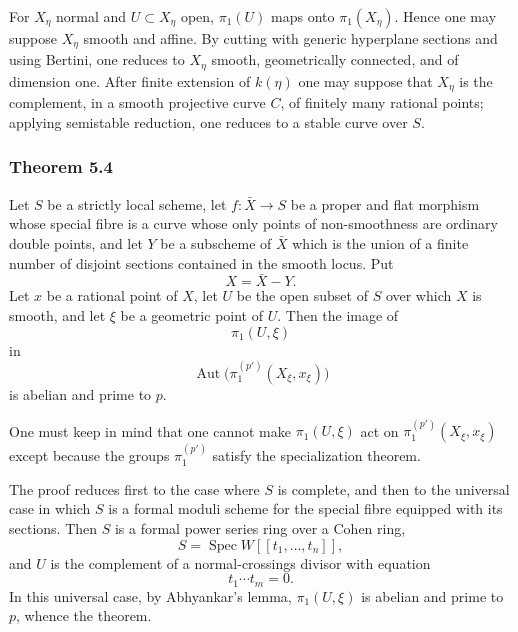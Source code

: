 \documentclass[11pt]{article}
\providecommand{\Spec}{\operatorname{Spec}}
\providecommand{\Aut}{\operatorname{Aut}}
\providecommand{\Hom}{\operatorname{Hom}}
\begin{document}
For $X_\eta$ normal and $U\subset X_\eta$ open, $\pi_1(U)$ maps onto $\pi_1(X_\eta)$. Hence one may suppose $X_\eta$ smooth and affine. By cutting with generic hyperplane sections and using Bertini, one reduces to $X_\eta$ smooth, geometrically connected, and of dimension one. After finite extension of $k(\eta)$ one may suppose that $X_\eta$ is the complement, in a smooth projective curve $C$, of finitely many rational points; applying semistable reduction, one reduces to a stable curve over $S$.



\providecommand{\cA}{\mathcal A}
\providecommand{\cV}{\mathcal V}
\providecommand{\cF}{\mathcal F}
\providecommand{\Hom}{\operatorname{Hom}}
\providecommand{\coker}{\operatorname{coker}}
\providecommand{\codim}{\operatorname{codim}}
\providecommand{\Coker}{\operatorname{Coker}}
\providecommand{\Picard}{\operatorname{Pic}}
\providecommand{\End}{\operatorname{End}}
\providecommand{\Prof}{\operatorname{prof}}
\providecommand{\Ima}{\operatorname{Im}}
\providecommand{\Frob}{\operatorname{Frob}}
\providecommand{\cQ}{\mathcal Q}
\providecommand{\Et}{\mathrm{et}}
\providecommand{\profp}{\widehat{\mathbb Z}^{(p')}}


\subsubsection*{Theorem 5.4}
Let $S$ be a strictly local scheme, let $f:\bar X\to S$ be a proper and flat morphism whose special fibre is a curve whose only points of non-smoothness are ordinary double points, and let $Y$ be a subscheme of $\bar X$ which is the union of a finite number of disjoint sections contained in the smooth locus. Put
\[
 X=\bar X-Y.
\]
Let $x$ be a rational point of $X$, let $U$ be the open subset of $S$ over which $X$ is smooth, and let $\xi$ be a geometric point of $U$. Then the image of
\[
 \pi_1(U,\xi)
\]
in
\[
 \Aut\bigl(\pi_1^{(p')}(X_\xi,x_\xi)\bigr)
\]
is abelian and prime to $p$.

One must keep in mind that one cannot make $\pi_1(U,\xi)$ act on $\pi_1^{(p')}(X_\xi,x_\xi)$ except because the groups $\pi_1^{(p')}$ satisfy the specialization theorem.

The proof reduces first to the case where $S$ is complete, and then to the universal case in which $S$ is a formal moduli scheme for the special fibre equipped with its sections. Then $S$ is a formal power series ring over a Cohen ring,
\[
 S=\Spec W[[t_1,\ldots,t_n]],
\]
and $U$ is the complement of a normal-crossings divisor with equation
\[
 t_1\cdots t_m=0.
\]
In this universal case, by Abhyankar's lemma, $\pi_1(U,\xi)$ is abelian and prime to $p$, whence the theorem.
\end{document}
